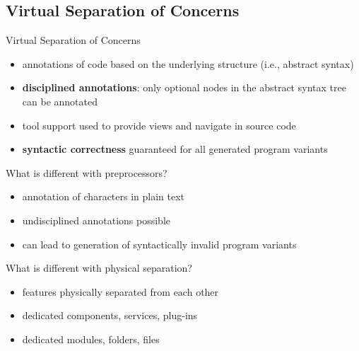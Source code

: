 \subsection{Virtual Separation of Concerns}
\begin{frame}{\myframetitle\mysource{\virtualseparation}}
	\begin{mycolumns}
		\begin{definition}{Virtual Separation of Concerns}
			\begin{itemize}
				\item annotations of code based on the underlying structure (i.e., abstract syntax)
				\item \textbf{disciplined annotations}: only optional nodes in the abstract syntax tree can be annotated
				\item tool support used to provide views and navigate in source code
				\item \textbf{syntactic correctness} guaranteed for all generated program variants
			\end{itemize}
		\end{definition}
	\mynextcolumn
		\begin{note}{What is different with preprocessors?}
			\begin{itemize}
				\item annotation of characters in plain text
				\item undisciplined annotations possible
				\item can lead to generation of syntactically invalid program variants
			\end{itemize}
		\end{note}
		\begin{note}{What is different with physical separation?}
			\begin{itemize}
				\item features physically separated from each other
				\item dedicated components, services, plug-ins \lecturemodules
				\item dedicated modules, folders, files \lecturelanguages
			\end{itemize}
		\end{note}
	\end{mycolumns}
\end{frame}

